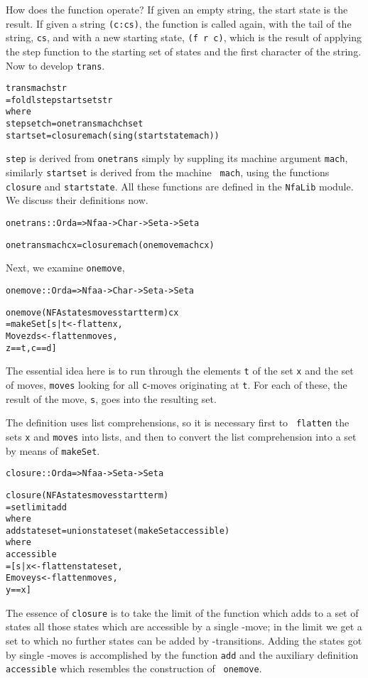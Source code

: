 \documentclass[11pt]{article}
\begin{document}
How does the function operate? If given an empty string, the
start state is the result. If given a string {\tt (c:cs)}, the function is
called again, with the tail of the string, {\tt cs}, and with a new starting
state, {\tt (f r c)}, which is the result of applying the step function to the
starting set of states and the first character of the string.
Now to develop {\tt trans}.
\begin{alltt}
trans mach str
    = foldl step startset str
      where
      step set ch = onetrans mach ch set
      startset = closure mach (sing (startstate mach))
\end{alltt}
{\tt step} is derived from {\tt onetrans} simply by suppling its machine
argument {\tt mach}, similarly {\tt startset} is derived from the machine {\tt
mach}, using the functions {\tt closure} and {\tt startstate}. All these
functions are defined in the {\tt NfaLib} module. We discuss their definitions now.
\begin{alltt}
onetrans :: Ord a => Nfa a -> Char -> Set a -> Set a

onetrans mach c x = closure mach (onemove mach c x)
\end{alltt}
Next, we examine {\tt onemove},
\begin{alltt}
onemove :: Ord a => Nfa a -> Char -> Set a -> Set a

onemove (NFA states moves start term) c x
  = makeSet [ s | t <- flatten x , 
                  Move z d s <- flatten moves ,
                  z==t , c==d ]
\end{alltt}
The essential idea here is to run through the elements {\tt t} of
the set {\tt x} and the set of
moves, {\tt moves} looking for all {\tt c}-moves originating at {\tt t}. For
each of these, the result of the move, {\tt s}, goes into the resulting set.

The definition uses list comprehensions, so it is necessary first to {\tt
flatten} the sets {\tt x} and {\tt moves} into lists, and then to convert the
list comprehension into a set by means of {\tt makeSet}.
\begin{alltt}
closure :: Ord a => Nfa a -> Set a -> Set a

closure (NFA states moves start term)
  = setlimit add
    where
    add stateset = union stateset (makeSet accessible)
                   where
                   accessible
                     = [ s | x <- flatten stateset , 
                             Emove y s <- flatten moves ,
                             y==x ]
\end{alltt}
The essence of {\tt closure} is to take the limit of the function which adds
to a set of states all those states which are accessible by a single
\eps-move; in the limit we get a set to which no further states can be added
by \eps-transitions. Adding the states got by single \eps-moves is accomplished by the function {\tt add} and the auxiliary
definition {\tt accessible} which resembles the construction of {\tt
onemove}.
\end{document}

